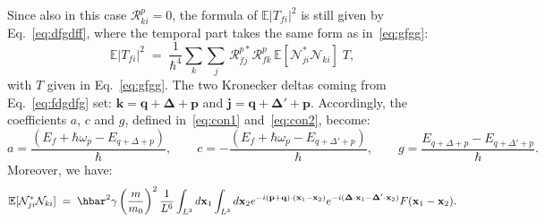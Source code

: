 \documentclass[12pt,onecolumn,amssymb,nofootinbib]{revtex4-2} %
\newcommand*{\boldvec}[1]{\ensuremath{\boldsymbol{#1}}}%
\let\vec\boldvec%
\begin{document}
Since also in this case ${\mathcal R}_{ki}^{p}=0$, the formula of
$\mathbb{E}|T_{fi}|^{2}$ is still given by Eq.~\eqref{eq:dfgdff}, where the temporal part takes the same form as in~\eqref{eq:gfgg}:
\begin{equation} \label{eq:mod2b}
\mathbb{E}|T_{fi}|^{2} \; = \;
\frac{1}{\hbar^{4}}\underset{k}{\sum}\underset{j}{\sum}\, {\mathcal R}_{fj}^{p*} {\mathcal R}_{fk}^{p}\, {\mathbb E}[{\mathcal N}_{ji}^{*} {\mathcal N}_{ki}] \; T,
\end{equation}
with $T$ given in Eq.~\eqref{eq:gfgg}.
The two Kronecker deltas coming from Eq.~\eqref{eq:fdgdfg} set: $\mathbf{k=q+\Delta+p}$ and  $\mathbf{j=q+\Delta'+p}$.
Accordingly, the coefficients $a$, $c$ and $g$, defined in~\eqref{eq:con1}
and~\eqref{eq:con2}, become:
\begin{equation} \label{eq:fgf}
a=\frac{\left(E_{f}+\hbar\omega_{p}-E_{q+\Delta+p}\right)}{\hbar},\qquad
c=-\frac{\left(E_{f}+\hbar\omega_{p}-E_{q+\Delta'+p}\right)}{\hbar},\qquad
g=\frac{E_{q+\Delta+p}-E_{q+\Delta'+p}}{\hbar}.
\end{equation}
Moreover, we have:
\begin{equation} \label{eq:cgxcgdfs}
{\mathbb E}[{\mathcal N}_{ji}^{*} {\mathcal N}_{ki}] \; = \; \hbar^2 \gamma \left( \frac{m}{m_0} \right)^2 \frac{1}{L^6} \int_{L^3} d {\bf x}_1 \int_{L^3} d {\bf x}_2 e^{-i({\bf p+q})\cdot ({\bf x}_1 - {\bf x}_2)} e^{-i ({\bf \Delta}\cdot {\bf x}_1 - {\bf \Delta}'\cdot {\bf x}_2)} F({\bf x}_1 - {\bf x}_2).
\end{equation}
\end{document}
